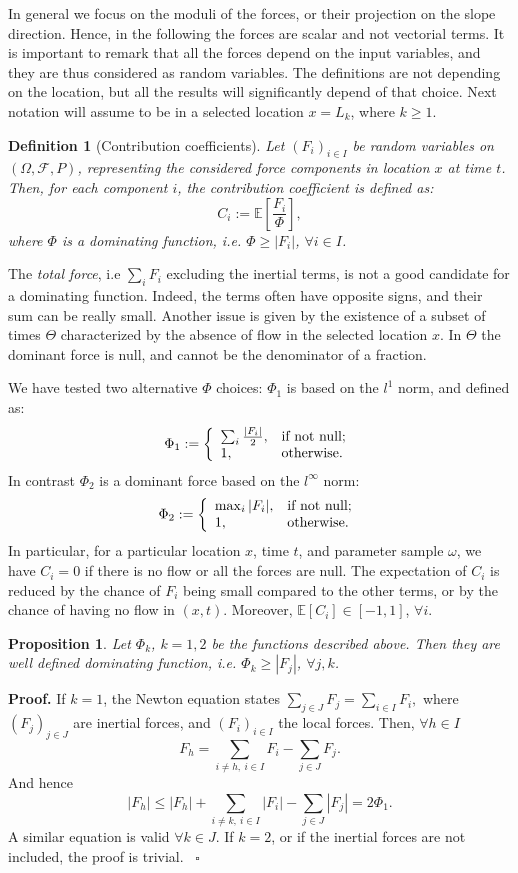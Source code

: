 \documentclass{article}
\newtheorem{definition}[theorem]{Definition}
\newtheorem{proposition}[theorem]{Proposition}
\newenvironment{proof}[1][Proof]{\noindent\textbf{#1.} }{\ $\square$}
\begin{document}
In general we focus on the moduli of the forces, or their projection on the slope direction. Hence, in the following the forces are scalar and not vectorial terms. It is important to remark that all the forces depend on the input variables, and they are thus considered as random variables. The definitions are not depending on the location, but all the results will significantly depend of that choice. Next notation will assume to be in a selected location $x=L_k$, where $k\ge 1$.

\begin{definition}[Contribution coefficients]
Let $(F_i)_{i\in I}$ be random variables on $(\Omega, \mathcal F, P)$, representing the considered force components in location $x$ at time $t$. Then, for each component $i$, the contribution coefficient is defined as:
$$C_i:=\mathbb E\left[\frac{F_i}{\Phi}\right],$$
where $\Phi$ is a dominating function, i.e. $\Phi\ge |F_i|$, $\forall i\in I$.
\end{definition}
The \emph{total force}, i.e $\sum_i F_i$ excluding the inertial terms, is not a good candidate for a dominating function. Indeed, the terms often have opposite signs, and their sum can be really small. Another issue is given by the existence of a subset of times $\Theta$ characterized by the absence of flow in the selected location $x$. In $\Theta$ the dominant force is null, and cannot be the denominator of a fraction.

We have tested two alternative $\Phi$ choices: $\Phi_1$ is based on the $l^1$ norm, and defined as:
$$\Phi_1:=\left\{
    \begin{array}{ll}
      \sum_i \frac{|F_i|}{2}, & \hbox{if not null;} \\
      1, & \hbox{otherwise.}
    \end{array}
  \right.$$
In contrast $\Phi_2$ is a dominant force based on the $l^\infty$ norm:
$$\Phi_2:=\left\{
    \begin{array}{ll}
      \max_i |F_i|, & \hbox{if not null;} \\
      1, & \hbox{otherwise.}
    \end{array}
  \right.$$
In particular, for a particular location $x$, time $t$, and parameter sample $\omega$, we have $C_i=0$ if there is no flow or all the forces are null. The expectation of $C_i$ is reduced by the chance of $F_i$ being small compared to the other terms, or by the chance of having no flow in $(x,t)$. Moreover, $\mathbb E[C_i]\in[-1,1]$, $\forall i$.
\begin{proposition}
Let $\Phi_k$, $k=1,2$ be the functions described above. Then they are well defined dominating function, i.e. $\Phi_k\ge |F_j|$, $\forall j,k$.
\end{proposition}
\begin{proof}
If $k=1$, the Newton equation states $\sum_{j\in J} F_j =\sum_{i\in I} F_i,$ where $(F_j)_{j\in J}$ are inertial forces, and $(F_i)_{i\in I}$ the local forces. Then, $\forall h\in I$
$$F_h=\sum_{i\neq h,\ i\in I} F_i - \sum_{j\in J} F_j.$$
And hence
$$|F_h|\le |F_h|+\sum_{i\neq k,\ i\in I} |F_i| - \sum_{j\in J} |F_j|=2\Phi_1.$$
A similar equation is valid $\forall k\in J$. If $k=2$, or if the inertial forces are not included, the proof is trivial.
\end{proof}
\end{document}
